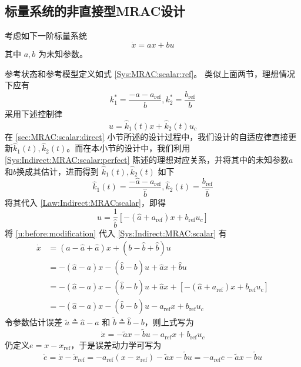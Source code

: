 \subsection{标量系统的非直接型MRAC设计}

考虑如下一阶标量系统
\begin{equation}
  \dot{x} = a x + b  u \label{Sys:Indirect:MRAC:scalar}
\end{equation}
其中 $a, b$ 为未知参数。

参考状态和参考模型定义如式 \eqref{Sys:MRAC:scalar:ref}。
类似上面两节，理想情况下应有
\begin{equation}
  k^{\ast}_1 = \frac{-a - a_{\ensuremath{\operatorname{ref}}}}{b}, k^{\ast}_2 =
  \frac{b_{\ensuremath{\operatorname{ref}}}}{b}
  \label{Sys:Indirect:MRAC:scalar:perfect}
\end{equation}
采用下述控制律
\begin{equation}
  u = \hat{k}_1 (t) x + \hat{k}_2 (t) u_c\label{Law:Indirect:MRAC:scalar}
\end{equation}
在 \ref{sec:MRAC:scalar:direct} 小节所述的设计过程中，我们设计的自适应律直接更新$\hat{k}_1 (t), \hat{k}_2 (t)$。而在本小节的设计中，我们利用
\eqref{Sys:Indirect:MRAC:scalar:perfect} 陈述的理想对应关系，并将其中的未知参数$a$和$b$换成其估计，进而得到 $\hat{k}_1 (t), \hat{k}_2 (t)$ 如下
\[ \hat{k}_1 (t) = \frac{-\hat{a} -
   a_{\ensuremath{\operatorname{ref}}}}{\hat{b}}, \hat{k}_2 (t) =
   \frac{b_{\ensuremath{\operatorname{ref}}}}{\hat{b}} \]
将其代入 \eqref{Law:Indirect:MRAC:scalar}，即得
\begin{equation}
  u = \frac{1}{\hat{b}} [-(\hat{a} + a_{\ensuremath{\operatorname{ref}}}) x +
  b_{\ensuremath{\operatorname{ref}}} u_c] \label{u:before:modification}
\end{equation}
将 \eqref{u:before:modification} 代入 \eqref{Sys:Indirect:MRAC:scalar} 有
\begin{align}
  \dot{x} & = (a - \hat{a} + \hat{a})  x + (b - \hat{b} + \hat{b} ) u
  \nonumber\\
  & = -(\hat{a} - a)  x -(\hat{b} -b)  u + \hat{a} x + \hat{b} u \nonumber\\
  & = -(\hat{a} - a)  x -(\hat{b} -b)  u + \hat{a} x + [-(\hat{a} + a_{\ensuremath{\operatorname{ref}}}) x +
  b_{\ensuremath{\operatorname{ref}}} u_c]\nonumber \\
  & = -(\hat{a} - a)  x -(\hat{b} -b)  u -a_{\ensuremath{\operatorname{ref}}} x +
  b_{\ensuremath{\operatorname{ref}}} u_c \nonumber
\end{align}
令参数估计误差 $\tilde{a}  \triangleq \hat{a} - a$ 和 $\tilde{b}  \triangleq \hat{b} -b$，则上式写为
\begin{equation*}
   \dot{x}  = -\tilde{a}  x - \tilde{b}  u - a_{\ensuremath{\operatorname{ref}}} x +
  b_{\ensuremath{\operatorname{ref}}} u_c
\end{equation*}
仍定义$e=x-x_{\operatorname{ref}}$，于是误差动力学可写为
\begin{equation}
  \dot{e} =\dot{x}-\dot{x}_{\operatorname{ref}}= - a_{\ensuremath{\operatorname{ref}}} (x-x_{\operatorname{ref}})- \tilde{a}  x - \tilde{b}u= -a_{\ensuremath{\operatorname{ref}}} e - \tilde{a}  x - \tilde{b}u\label{error_dyn_indirect}
\end{equation}


